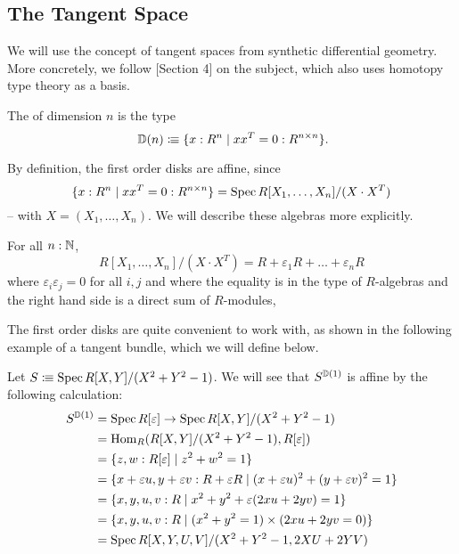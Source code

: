 \subsection{The Tangent Space}

We will use the concept of tangent spaces from synthetic differential geometry.
More concretely, we follow \cite{david-orbifolds}[Section 4]
on the subject, which also uses homotopy type theory as a basis.

\begin{definition}
  The  of dimension $n$ is the type
  \[ \D(n)\colonequiv \{x:R^n \mid xx^T = 0 : R^{n \times n}\}\rlap{.}\]
\end{definition}

By definition, the first order disks are affine, since
\[
  \{x:R^n \mid xx^T = 0 : R^{n \times n}\} = \operatorname{Spec} R[X_1,\dots,X_n]/(X\cdot X^T)
\]
-- with $X=(X_1,\dots,X_n)$.
We will describe these algebras more explicitly.

\begin{lemma}%
  For all $n:\mathbb{N}$,
  \[
    R[X_1,\dots,X_n]/(X\cdot X^T) = R+\varepsilon_1R+\dots+\varepsilon_nR
  \]
  where $\varepsilon_i\varepsilon_j=0$ for all $i,j$ and
  where the equality is in the type of $R$-algebras and the right hand side is a direct sum of $R$-modules,
\end{lemma}

The first order disks are quite convenient to work with,
as shown in the following example of a tangent bundle,
which we will define below.

\begin{example}%
  \label{example-tangent-bundle}
  Let $S\vcentcolon\mspace{-1.2mu}\equiv\operatorname{Spec} R[X,Y]/(X^2+Y^2-1)$.
  We will see that $S^{\mathbb{D}(1)}$ is affine by the following calculation:
  \begin{align*}
    S^{\mathbb{D}(1)} &= \operatorname{Spec} R[\varepsilon] \to \operatorname{Spec} R[X,Y]/(X^2+Y^2-1) \\
              &= \mathrm{Hom}_R(R[X,Y]/(X^2+Y^2-1), R[\varepsilon]) \\
              &= \{{z,w:R[\varepsilon]} \mid z^2+w^2=1 \} \\
              &= \{x+\varepsilon u, y+\varepsilon v:R+\varepsilon R \mid (x+\varepsilon u)^2+(y+\varepsilon v)^2=1 \} \\
              &= \{x,y,u,v:R \mid x^2+y^2+\varepsilon (2xu+2yv)=1 \} \\
              &=\{x,y,u,v:R \mid (x^2+y^2=1)\times(2xu+2yv=0)\} \\
    &=\operatorname{Spec} R[X,Y,U,V]/(X^2+Y^2-1,2XU+2YV)
  \end{align*}
\end{example}

